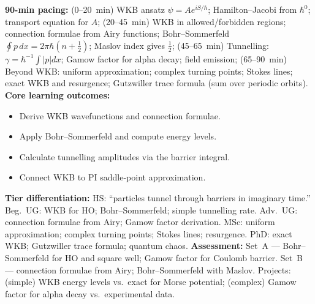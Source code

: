\documentclass[11pt,a4paper]{article}
\begin{document}
\begin{tcolorbox}[modulebox, title={Module~II.2 --- Lecture L04: Saddle-Point Approximation and WKB}]
\textbf{90-min pacing:} (0--20~min) WKB ansatz $\psi=A e^{iS/\hbar}$; Hamilton--Jacobi from $\hbar^0$; transport equation for $A$; (20--45~min) WKB in allowed/forbidden regions; connection formulae from Airy functions; Bohr--Sommerfeld $\oint p\,dx=2\pi\hbar(n+\tfrac{1}{2})$; Maslov index gives $\tfrac{1}{2}$; (45--65~min) Tunnelling: $\gamma=\hbar^{-1}\int|p|dx$; Gamow factor for alpha decay; field emission; (65--90~min) Beyond WKB: uniform approximation; complex turning points; Stokes lines; exact WKB and resurgence; Gutzwiller trace formula (sum over periodic orbits).
\medskip\textbf{Core learning outcomes:}
\begin{itemize}[leftmargin=1.4em,topsep=2pt,itemsep=1pt]
  \item Derive WKB wavefunctions and connection formulae.
  \item Apply Bohr--Sommerfeld and compute energy levels.
  \item Calculate tunnelling amplitudes via the barrier integral.
  \item Connect WKB to PI saddle-point approximation.
\end{itemize}
\medskip\textbf{Tier differentiation:}
HS: ``particles tunnel through barriers in imaginary time.''
Beg.\ UG: WKB for HO; Bohr--Sommerfeld; simple tunnelling rate.
Adv.\ UG: connection formulae from Airy; Gamow factor derivation.
MSc: uniform approximation; complex turning points; Stokes lines; resurgence.
PhD: exact WKB; Gutzwiller trace formula; quantum chaos.
\medskip\textbf{Assessment:}
Set~A --- Bohr--Sommerfeld for HO and square well; Gamow factor for Coulomb barrier.
Set~B --- connection formulae from Airy; Bohr--Sommerfeld with Maslov.
Projects: (simple) WKB energy levels vs.\ exact for Morse potential; (complex) Gamow factor for alpha decay vs.\ experimental data.
\end{tcolorbox}

\medskip
\end{document}
